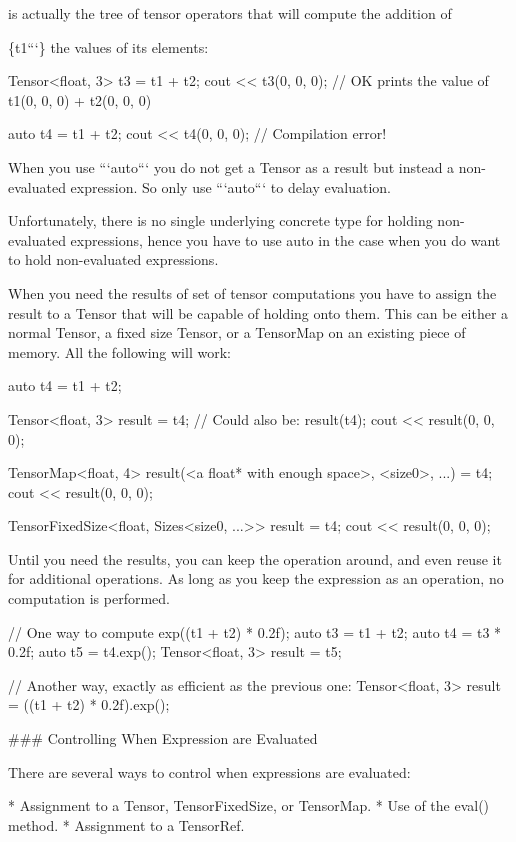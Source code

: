  is actually the tree of tensor operators that will compute the addition of 
\begin{DoxyCode}
\{t1```\}
the values of its elements:

    Tensor<float, 3> t3 = t1 + t2;
    cout << t3(0, 0, 0);  // OK prints the value of t1(0, 0, 0) + t2(0, 0, 0)

    auto t4 = t1 + t2;
    cout << t4(0, 0, 0);  // Compilation error!

When you use ```auto``` you do not get a Tensor as a result but instead a
non-evaluated expression.  So only use ```auto``` to delay evaluation.

Unfortunately, there is no single underlying concrete type for holding
non-evaluated expressions, hence you have to use auto in the case when you do
want to hold non-evaluated expressions.

When you need the results of set of tensor computations you have to assign the
result to a Tensor that will be capable of holding onto them.  This can be
either a normal Tensor, a fixed size Tensor, or a TensorMap on an existing
piece of memory.  All the following will work:

    auto t4 = t1 + t2;

    Tensor<float, 3> result = t4;  // Could also be: result(t4);
    cout << result(0, 0, 0);

    TensorMap<float, 4> result(<a float* with enough space>, <size0>, ...) = t4;
    cout << result(0, 0, 0);

    TensorFixedSize<float, Sizes<size0, ...>> result = t4;
    cout << result(0, 0, 0);

Until you need the results, you can keep the operation around, and even reuse
it for additional operations.  As long as you keep the expression as an
operation, no computation is performed.

    // One way to compute exp((t1 + t2) * 0.2f);
    auto t3 = t1 + t2;
    auto t4 = t3 * 0.2f;
    auto t5 = t4.exp();
    Tensor<float, 3> result = t5;

    // Another way, exactly as efficient as the previous one:
    Tensor<float, 3> result = ((t1 + t2) * 0.2f).exp();

### Controlling When Expression are Evaluated

There are several ways to control when expressions are evaluated:

*   Assignment to a Tensor, TensorFixedSize, or TensorMap.
*   Use of the eval() method.
*   Assignment to a TensorRef.


\end{DoxyCode}
